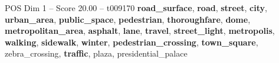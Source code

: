\begin{textsample}{POS Dim 1 – Score 20.00 – t009170}  \label{ex:f1_pos_017}
\textbf{road\_surface}, \textbf{road}, \textbf{street}, \textbf{city}, \textbf{urban\_area}, \textbf{public\_space}, \textbf{pedestrian}, \textbf{thoroughfare}, \textbf{dome}, \textbf{metropolitan\_area}, \textbf{asphalt}, \textbf{lane}, \textbf{travel}, \textbf{street\_light}, \textbf{metropolis}, \textbf{walking}, \textbf{sidewalk}, \textbf{winter}, \textbf{pedestrian\_crossing}, \textbf{town\_square}, zebra\_crossing, \textbf{traffic}, plaza, presidential\_palace

\end{textsample}

